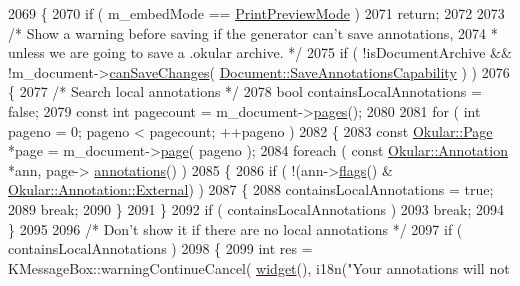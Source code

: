 \begin{DoxyCode}
2069 \{
2070     \textcolor{keywordflow}{if} ( m\_embedMode == \hyperlink{namespaceOkular_adbe21e337d65d3f5f07a441180428ba8a3c886e44dadfdb624559818a85d90b94}{PrintPreviewMode} )
2071        \textcolor{keywordflow}{return};
2072 
2073     \textcolor{comment}{/* Show a warning before saving if the generator can't save annotations,}
2074 \textcolor{comment}{     * unless we are going to save a .okular archive. */}
2075     \textcolor{keywordflow}{if} ( !isDocumentArchive && !m\_document->\hyperlink{classOkular_1_1Document_a46772ecd6dc23f6e07fb358eef32924d}{canSaveChanges}( 
      \hyperlink{classOkular_1_1Document_a7aa93fc147bd5aa966d65477b5c5eae9ab39f6065bb5cff48353657ac469f827b}{Document::SaveAnnotationsCapability} ) )
2076     \{
2077         \textcolor{comment}{/* Search local annotations */}
2078         \textcolor{keywordtype}{bool} containsLocalAnnotations = \textcolor{keyword}{false};
2079         \textcolor{keyword}{const} \textcolor{keywordtype}{int} pagecount = m\_document->\hyperlink{classOkular_1_1Document_aaf5d986758e25127946986abaa401bcd}{pages}();
2080 
2081         \textcolor{keywordflow}{for} ( \textcolor{keywordtype}{int} pageno = 0; pageno < pagecount; ++pageno )
2082         \{
2083             \textcolor{keyword}{const} \hyperlink{classOkular_1_1Page}{Okular::Page} *page = m\_document->\hyperlink{classOkular_1_1Document_a1c95c2f192d739c217d00971da48f69d}{page}( pageno );
2084             \textcolor{keywordflow}{foreach} ( \textcolor{keyword}{const} \hyperlink{classOkular_1_1Annotation}{Okular::Annotation} *ann, page->
      \hyperlink{classOkular_1_1Page_ad82e0f26d5435b5ccfa3d23c359ac23c}{annotations}() )
2085             \{
2086                 \textcolor{keywordflow}{if} ( !(ann->\hyperlink{classOkular_1_1Annotation_a3d6f7ee5057155b90e76c24768880947}{flags}() & \hyperlink{classOkular_1_1Annotation_a8a214541446745761efeda70b3a4302eabe908102c97a725aa1928602f17833c0}{Okular::Annotation::External}) )
2087                 \{
2088                     containsLocalAnnotations = \textcolor{keyword}{true};
2089                     \textcolor{keywordflow}{break};
2090                 \}
2091             \}
2092             \textcolor{keywordflow}{if} ( containsLocalAnnotations )
2093                 \textcolor{keywordflow}{break};
2094         \}
2095 
2096         \textcolor{comment}{/* Don't show it if there are no local annotations */}
2097         \textcolor{keywordflow}{if} ( containsLocalAnnotations )
2098         \{
2099             \textcolor{keywordtype}{int} res = KMessageBox::warningContinueCancel( \hyperlink{classKParts_1_1Part_a134900cb0605a1cd5113d90954a01fdf}{widget}(), i18n(\textcolor{stringliteral}{"Your annotations will not
}
\end{DoxyCode}
